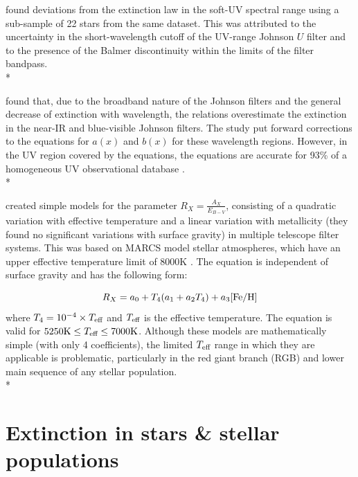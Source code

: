 \documentclass[12pt, a4paper]{report}
\begin{document}
\cite{1994ApJ...422..158O} found deviations from the \cite{1989ApJ...345..245C} extinction law in the soft-UV spectral range using a sub-sample of 22 stars from the same dataset. This was attributed to the uncertainty in the short-wavelength cutoff of the UV-range Johnson $U$ filter and to the presence of the Balmer discontinuity within the limits of the filter bandpass.\\*

\cite{1999PASP..111...63F} found that, due to the broadband nature of the Johnson filters and the general decrease of extinction with wavelength, the \cite{1989ApJ...345..245C} relations overestimate the extinction in the near-IR and blue-visible Johnson filters. The study put forward corrections to the equations for $a(x)$ and $b(x)$ for these wavelength regions. However, in the UV region covered by  the \cite{1989ApJ...345..245C} equations, the equations are accurate for 93\% of a homogeneous UV observational database \citep{2004ApJ...616..912V}.\\*

\cite{2014MNRAS.444..392C,2018MNRAS.475.5023C,2018MNRAS.479L.102C} created simple  models for the parameter $R_{X}  = \frac{A_{X}}{E_{B-V}}$, consisting of a quadratic variation with effective temperature and a linear variation with metallicity (they found no significant variations with surface gravity) in multiple telescope filter systems. This was based on MARCS model stellar atmospheres, which have an upper effective temperature limit of 8000K \citep{2008A&A...486..951G}. The equation is independent of surface gravity and has the following form:

\begin{equation}
R_{X} = a_{0} + T_{4}(a_{1} + a_{2}T_{4}) + a_{3}\textnormal{[Fe/H]}
\label{casagrande_ext_fit}
\end{equation}
where $T_{4} = 10^{-4} \times T_{\textnormal{eff}}$ and $T_{\textnormal{eff}}$ is the effective temperature. The equation is valid for $5250\textnormal{K} \leq T_{\textnormal{eff}} \leq 7000\textnormal{K}$. Although these models are mathematically simple (with only 4 coefficients), the limited $T_{\textnormal{eff}}$ range in which they are applicable is problematic, particularly in the red giant branch (RGB) and lower main sequence of any stellar population.\\*

\section{Extinction in stars \& stellar populations}
\end{document}
